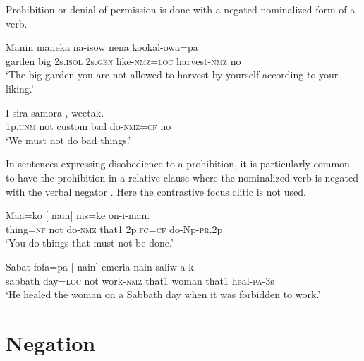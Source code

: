 Prohibition or denial of permission is done with a negated nominalized form of a verb.

\ea%
\label{ex:6:x1087}
\gll Manin  maneka  na-isow  nena  kookal-owa=pa    \\
garden  big  2s.\textsc{isol}  2s.\textsc{gen}  like-\textsc{nmz}=\textsc{loc}  harvest-\textsc{nmz} no\\
\glt `The big garden you are not allowed to harvest by yourself according to your liking.'
\z

\ea%
\label{ex:6:x1078}
\gll I    sira  samora  , weetak.\\
1p.\textsc{unm}  not  custom  bad  do-\textsc{nmz}=\textsc{cf}  no\\
\glt `We must not do bad things.'
\z

In sentences expressing disobedience to a prohibition, it is particularly common to have the prohibition in a relative clause where the nominalized verb is negated with the verbal negator . Here the contrastive focus clitic is not used. 

\ea%
\label{ex:6:x1887}
\gll Maa=ko  [    nain]  nis=ke  on-i-man. \\
thing=\textsc{nf}  not  do-\textsc{nmz}  that1  2p.\textsc{fc}=\textsc{cf}  do-Np-\textsc{pr}.2p\\
\glt `You do things that must not be done.'
\z

\ea%
\label{ex:6:x1888}
\gll Sabat  fofa=pa  [    nain]  emeria  nain  saliw-a-k. \\
sabbath  day=\textsc{loc}  not  work-\textsc{nmz}  that1  woman  that1  heal-\textsc{pa}-3s\\
\glt `He healed the woman on a Sabbath day when it was forbidden to work.'
\z

\section{Negation}\label{sec:6.2} \footnotemark{}

